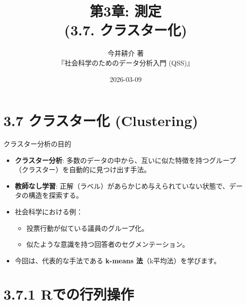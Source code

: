 \documentclass[
  ignorenonframetext,
]{beamer}
\title{第3章: 測定\\
(3.7. クラスター化)}
\subtitle{今井耕介 著\\
『社会科学のためのデータ分析入門 (QSS)』}
\author{}
\date{\vspace{-2.5em}2026-03-09}
\providecommand{\tightlist}{%
  \setlength{\itemsep}{0pt}\setlength{\parskip}{0pt}}
\begin{document}
\frame{\titlepage}

\hypertarget{ux30afux30e9ux30b9ux30bfux30fcux5316-clustering}{%
\section{3.7 クラスター化
(Clustering)}\label{ux30afux30e9ux30b9ux30bfux30fcux5316-clustering}}

\begin{frame}{クラスター分析の目的}
\protect\hypertarget{ux30afux30e9ux30b9ux30bfux30fcux5206ux6790ux306eux76eeux7684}{}
\begin{itemize}
\tightlist
\item
  \textbf{クラスター分析}:
  多数のデータの中から、互いに似た特徴を持つグループ（クラスター）を自動的に見つけ出す手法。
\item
  \textbf{教師なし学習}:
  正解（ラベル）があらかじめ与えられていない状態で、データの構造を探索する。
\item
  社会科学における例：

  \begin{itemize}
  \tightlist
  \item
    投票行動が似ている議員のグループ化。
  \item
    似たような意識を持つ回答者のセグメンテーション。
  \end{itemize}
\item
  今回は、代表的な手法である \textbf{k-means 法}（k平均法）を学びます。
\end{itemize}
\end{frame}

\hypertarget{rux3067ux306eux884cux5217ux64cdux4f5c}{%
\section{3.7.1
Rでの行列操作}\label{rux3067ux306eux884cux5217ux64cdux4f5c}}
\end{document}

